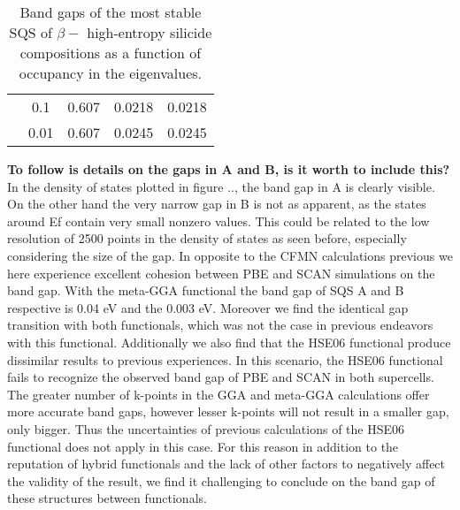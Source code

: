 \begin{table}[H]
\begin{tabular}{@{}ccccc@{}}
\multicolumn{1}{c|}{}                                  & \multicolumn{1}{c|}{0.1}  & 0.607                                                                         & 0.0218                                                                        & 0.0218                                                                         \\
\multicolumn{1}{c|}{}                                  & \multicolumn{1}{c|}{0.01} & 0.607                                                                         & 0.0245                                                                        & 0.0245                                                                         \\ \bottomrule
\end{tabular}
\caption{Band gaps of the most stable SQS of $\beta-$  high-entropy silicide compositions as a function of occupancy in the eigenvalues.}
\end{table}


\textbf{To follow is details on the gaps in A and B, is it worth to include this?}
In the density of states plotted in figure .., the band gap in A is clearly visible. On the other hand the very narrow gap in B is not as apparent, as the states around Ef contain very small nonzero values.  This could be related to the low resolution of 2500 points in the density of states as seen before, especially considering the size of the gap. In opposite to the CFMN calculations previous we here experience excellent cohesion between PBE and SCAN simulations on the band gap. With the meta-GGA functional the band gap of SQS A and B respective is 0.04 eV and the 0.003 eV. Moreover we find the identical gap transition with both functionals, which was not the case in previous endeavors with this functional. Additionally we also find that the HSE06 functional produce dissimilar results to previous experiences. In this scenario, the HSE06 functional fails to recognize the observed band gap of PBE and SCAN in both supercells. The greater number of k-points in the GGA and meta-GGA calculations offer more accurate band gaps, however lesser k-points will not result in a smaller gap, only bigger. Thus the uncertainties of previous calculations of the HSE06 functional does not apply in this case. For this reason in addition to the reputation of hybrid functionals and the lack of other factors to negatively affect the validity of the result, we find it challenging to conclude on the band gap of these structures between functionals.

